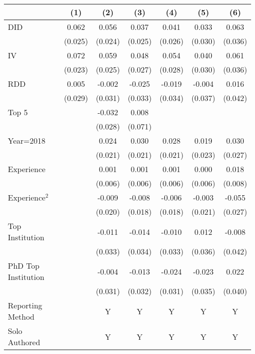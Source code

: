 \begin{tabular}{l*{6}{c}}
\hline\hline
                &\multicolumn{1}{c}{(1)}&\multicolumn{1}{c}{(2)}&\multicolumn{1}{c}{(3)}&\multicolumn{1}{c}{(4)}&\multicolumn{1}{c}{(5)}&\multicolumn{1}{c}{(6)}\\
\hline
DID             &    0.062&    0.056&    0.037&    0.041&    0.033&    0.063\\
                &  (0.025)&  (0.024)&  (0.025)&  (0.026)&  (0.030)&  (0.036)\\
IV              &    0.072&    0.059&    0.048&    0.054&    0.040&    0.061\\
                &  (0.023)&  (0.025)&  (0.027)&  (0.028)&  (0.030)&  (0.036)\\
RDD             &    0.005&   -0.002&   -0.025&   -0.019&   -0.004&    0.016\\
                &  (0.029)&  (0.031)&  (0.033)&  (0.034)&  (0.037)&  (0.042)\\
Top 5           &         &   -0.032&    0.008&         &         &         \\
                &         &  (0.028)&  (0.071)&         &         &         \\
Year=2018       &         &    0.024&    0.030&    0.028&    0.019&    0.030\\
                &         &  (0.021)&  (0.021)&  (0.021)&  (0.023)&  (0.027)\\
Experience      &         &    0.001&    0.001&    0.001&    0.000&    0.018\\
                &         &  (0.006)&  (0.006)&  (0.006)&  (0.006)&  (0.008)\\
Experience$^2$  &         &   -0.009&   -0.008&   -0.006&   -0.003&   -0.055\\
                &         &  (0.020)&  (0.018)&  (0.018)&  (0.021)&  (0.027)\\
Top Institution &         &   -0.011&   -0.014&   -0.010&    0.012&   -0.008\\
                &         &  (0.033)&  (0.034)&  (0.033)&  (0.036)&  (0.042)\\
PhD Top Institution&         &   -0.004&   -0.013&   -0.024&   -0.023&    0.022\\
                &         &  (0.031)&  (0.032)&  (0.031)&  (0.035)&  (0.040)\\
Reporting Method &         &        Y&        Y&        Y&        Y&        Y\\
Solo Authored   &         &        Y&        Y&        Y&        Y&        Y\\

\end{tabular}
